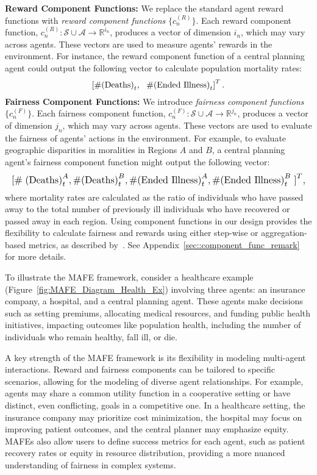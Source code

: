 \textbf{Reward Component Functions:} We replace the standard agent reward functions with \textit{reward component functions} \(\{c_n^{(R)}\}\). Each reward component function, \(c_n^{(R)}: \mathcal{S} \cup \boldsymbol{\mathcal{A}} \rightarrow \mathbb{R}^{i_n}\), produces a vector of dimension $i_n$, which may vary across agents. These vectors are used to measure agents' rewards in the environment. For instance, the reward component function of a central planning agent could output the following vector to calculate population mortality rates:
\begin{equation}
    \left[\#\text{(Deaths)}_t, \ \ \# \text{(Ended Illness)}_t \right]^T. \notag
\end{equation}
\textbf{Fairness Component Functions:} We introduce \textit{fairness component functions} \(\{c_n^{(F)}\}\). Each fairness component function, \(c_n^{(F)}: \mathcal{S} \cup \boldsymbol{\mathcal{A}} \rightarrow \mathbb{R}^{j_n}\), produces a vector of dimension $j_n$, which may vary across agents. These vectors are used to evaluate the fairness of agents' actions in the environment. For example, to evaluate geographic disparities in moralities in Regions $A$ and $B$, a central planning agent's fairness component function might output the following vector:
\begin{equation}
    \resizebox{\linewidth}{!}{$\left[\# \right. \text{(Deaths)}^A_t, \# \text{(Deaths)}^B_t, \# \text{(Ended Illness)}^A_t, \# \text{(Ended Illness)}^B_t \left. \right]^T $\notag,}
\end{equation}
where mortality rates are calculated as the ratio of individuals who have passed away to the total number of previously ill individuals who have recovered or passed away in each region. Using component functions in our design provides the flexibility to calculate fairness and rewards using either step-wise or aggregation-based metrics, as described by~\cite{xuadapting}. See Appendix~\ref{sec::component_func_remark} for more details.

To illustrate the MAFE framework, consider a healthcare example (Figure~\ref{fig:MAFE_Diagram_Health_Ex}) involving three agents: an insurance company, a hospital, and a central planning agent. These agents make decisions such as setting premiums, allocating medical resources, and funding public health initiatives, impacting outcomes like population health, including the number of individuals who remain healthy, fall ill, or die.

A key strength of the MAFE framework is its flexibility in modeling multi-agent interactions. Reward and fairness components can be tailored to specific scenarios, allowing for the modeling of diverse agent relationships. For example, agents may share a common utility function in a cooperative setting or have distinct, even conflicting, goals in a competitive one. In a healthcare setting, the insurance company may prioritize cost minimization, the hospital may focus on improving patient outcomes, and the central planner may emphasize equity. MAFEs also allow users to define success metrics for each agent, such as patient recovery rates or equity in resource distribution, providing a more nuanced understanding of fairness in complex systems.

